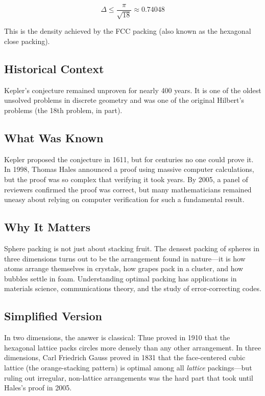\begin{equation}
\Delta \leq \frac{\pi}{\sqrt{18}} \approx 0.74048
\end{equation}

This is the density achieved by the FCC packing (also known as the hexagonal close packing).

\subsection{Historical Context}
Kepler's conjecture remained unproven for nearly 400 years. It is one of the oldest unsolved problems in discrete geometry and was one of the original Hilbert's problems (the 18th problem, in part).

\subsection{What Was Known}
Kepler proposed the conjecture in 1611, but for centuries no one could prove it. In 1998, Thomas Hales announced a proof using massive computer calculations, but the proof was so complex that verifying it took years. By 2005, a panel of reviewers confirmed the proof was correct, but many mathematicians remained uneasy about relying on computer verification for such a fundamental result.

\subsection{Why It Matters}
Sphere packing is not just about stacking fruit. The densest packing of spheres in three dimensions turns out to be the arrangement found in nature---it is how atoms arrange themselves in crystals, how grapes pack in a cluster, and how bubbles settle in foam. Understanding optimal packing has applications in materials science, communications theory, and the study of error-correcting codes.

\subsection{Simplified Version}
In two dimensions, the answer is classical: Thue proved in 1910 that the hexagonal lattice packs circles more densely than any other arrangement. In three dimensions, Carl Friedrich Gauss proved in 1831 that the face-centered cubic lattice (the orange-stacking pattern) is optimal among all \emph{lattice} packings---but ruling out irregular, non-lattice arrangements was the hard part that took until Hales's proof in 2005.

